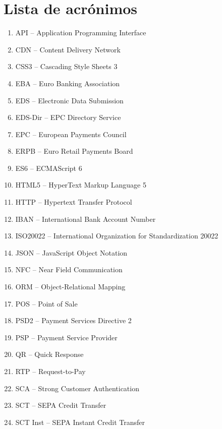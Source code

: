 \documentclass{article}
\begin{document}
\newpage


\newpage
\tableofcontents

\newpage
{} %
\section*{Lista de acrónimos}
\label{sec:Lista de acrónimos}
\begin{acronym}[SRTP]
\begin{enumerate}
  \item API – Application Programming Interface
  \item CDN – Content Delivery Network
  \item CSS3 – Cascading Style Sheets 3
  \item EBA – Euro Banking Association
  \item EDS – Electronic Data Submission
  \item EDS-Dir – EPC Directory Service
  \item EPC – European Payments Council
  \item ERPB – Euro Retail Payments Board
  \item ES6 – ECMAScript 6
  \item HTML5 – HyperText Markup Language 5
  \item HTTP – Hypertext Transfer Protocol
  \item IBAN – International Bank Account Number
  \item ISO20022 – International Organization for Standardization 20022
  \item JSON – JavaScript Object Notation
  \item NFC – Near Field Communication
  \item ORM – Object-Relational Mapping
  \item POS – Point of Sale
  \item PSD2 – Payment Services Directive 2
  \item PSP – Payment Service Provider
  \item QR – Quick Response
  \item RTP – Request-to-Pay
  \item SCA – Strong Customer Authentication
  \item SCT – SEPA Credit Transfer
  \item SCT Inst – SEPA Instant Credit Transfer

\end{enumerate}
\end{acronym}
\end{document}
